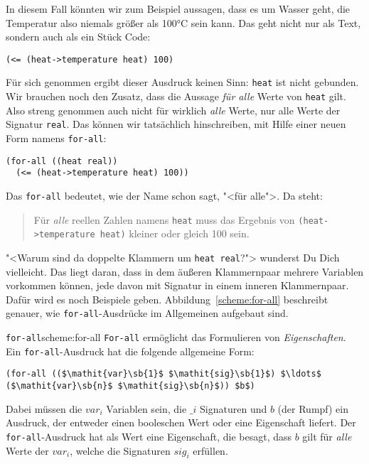 In diesem Fall könnten wir zum Beispiel aussagen, dass es um Wasser
geht, die Temperatur also niemals größer als 100\si{\degree}C sein kann.  Das
geht nicht nur als Text, sondern auch als ein Stück Code:
%
\begin{lstlisting}
(<= (heat->temperature heat) 100)
\end{lstlisting}
%
Für sich genommen ergibt dieser Ausdruck keinen Sinn: \lstinline{heat}
ist nicht gebunden.  Wir brauchen noch den Zusatz, dass die Aussage
\emph{für alle} Werte von \lstinline{heat} gilt.  Also streng genommen
auch nicht für wirklich \emph{alle} Werte, nur alle Werte der Signatur
\lstinline{real}. Das können wir tatsächlich hinschreiben, mit Hilfe
einer neuen Form namens \lstinline{for-all}:
%
\begin{lstlisting}
(for-all ((heat real))
  (<= (heat->temperature heat) 100))
\end{lstlisting}
%
Das \lstinline{for-all} 
bedeutet, wie der Name schon sagt, "<für alle">.  Da steht:
%
\begin{quote}
  Für \emph{alle} reellen Zahlen namens \lstinline{heat} muss das
  Ergebnis von \lstinline{(heat->temperature heat)} kleiner oder
  gleich 100 sein.
\end{quote}
%
"<Warum sind da doppelte Klammern um \lstinline{heat real}?"> wunderst
Du Dich vielleicht.  Das liegt daran, dass in dem äußeren Klammernpaar
mehrere Variablen vorkommen können, jede davon mit Signatur in einem
inneren Klammernpaar.  Dafür wird es noch Beispiele geben.
Abbildung~\ref{scheme:for-all} beschreibt genauer, wie
\lstinline{for-all}-Ausdrücke im Allgemeinen aufgebaut sind.

\begin{feature}{\lstinline{for-all}}{scheme:for-all}
  \lstinline{For-all} ermöglicht das
  Formulieren von \textit{Eigenschaften}.  Ein
  \lstinline{for-all}-Ausdruck hat die folgende allgemeine Form:
%
\begin{lstlisting}
(for-all (($\mathit{var}\sb{1}$ $\mathit{sig}\sb{1}$) $\ldots$ ($\mathit{var}\sb{n}$ $\mathit{sig}\sb{n}$)) $b$)
\end{lstlisting}
%
Dabei müssen die $\mathit{var}_i$ Variablen sein, die $\_i$ Signaturen und $b$ (der
Rumpf) ein Ausdruck, der entweder einen booleschen Wert oder eine
Eigenschaft liefert.  Der \lstinline{for-all}-Ausdruck hat als Wert eine
Eigenschaft, die besagt, dass $b$ gilt für \emph{alle} Werte der
$\mathit{var}_i$, welche die Signaturen $\mathit{sig}_i$ erfüllen.
\end{feature}

